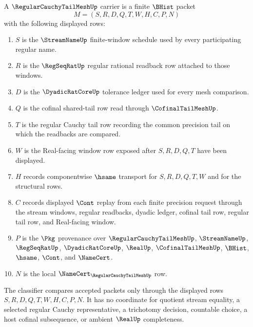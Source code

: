 \begin{definition}
\label{def:regular-cauchy-tail-mesh-carrier}
A $\RegularCauchyTailMeshUp$ carrier is a finite $\BHist$ packet
$$
M=(S,R,D,Q,T,W,H,C,P,N)
$$
with the following displayed rows:
\begin{enumerate}
\item $S$ is the $\StreamNameUp$ finite-window schedule used by every participating regular name.
\item $R$ is the $\RegSeqRatUp$ regular rational readback row attached to those windows.
\item $D$ is the $\DyadicRatCoreUp$ tolerance ledger used for every mesh comparison.
\item $Q$ is the cofinal shared-tail row read through $\CofinalTailMeshUp$.
\item $T$ is the regular Cauchy tail row recording the common precision tail on which the readbacks are compared.
\item $W$ is the Real-facing window row exposed after $S,R,D,Q,T$ have been displayed.
\item $H$ records componentwise $\hsame$ transport for $S,R,D,Q,T,W$ and for the structural rows.
\item $C$ records displayed $\Cont$ replay from each finite precision request through the stream windows, regular readbacks, dyadic ledger, cofinal tail row, regular tail row, and Real-facing window.
\item $P$ is the $\Pkg$ provenance over $\RegularCauchyTailMeshUp$, $\StreamNameUp$, $\RegSeqRatUp$, $\DyadicRatCoreUp$, $\RealUp$, $\CofinalTailMeshUp$, $\BHist$, $\hsame$, $\Cont$, and $\NameCert$.
\item $N$ is the local $\NameCert_{\RegularCauchyTailMeshUp}$ row.
\end{enumerate}
The classifier compares accepted packets only through the displayed rows $S,R,D,Q,T,W,H,C,P,N$. It has no coordinate for quotient stream equality, a selected regular Cauchy representative, a trichotomy decision, countable choice, a host cofinal subsequence, or ambient $\RealUp$ completeness.
\end{definition}


